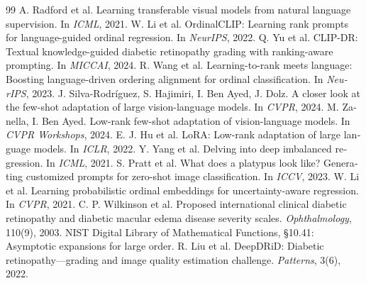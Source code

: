 \clearpage
{}
\begin{latin}
\renewcommand{\refname}{References}
\begin{thebibliography}{99}
 A. Radford et al. Learning transferable visual models from natural language supervision. In \emph{ICML}, 2021.
 W. Li et al. OrdinalCLIP: Learning rank prompts for language-guided ordinal regression. In \emph{NeurIPS}, 2022.
 Q. Yu et al. CLIP-DR: Textual knowledge-guided diabetic retinopathy grading with ranking-aware prompting. In \emph{MICCAI}, 2024.
 R. Wang et al. Learning-to-rank meets language: Boosting language-driven ordering alignment for ordinal classification. In \emph{NeurIPS}, 2023.
 J. Silva-Rodr\'iguez, S. Hajimiri, I. Ben Ayed, J. Dolz. A closer look at the few-shot adaptation of large vision-language models. In \emph{CVPR}, 2024.
 M. Zanella, I. Ben Ayed. Low-rank few-shot adaptation of vision-language models. In \emph{CVPR Workshops}, 2024.
 E. J. Hu et al. LoRA: Low-rank adaptation of large language models. In \emph{ICLR}, 2022.
 Y. Yang et al. Delving into deep imbalanced regression. In \emph{ICML}, 2021.
 S. Pratt et al. What does a platypus look like? Generating customized prompts for zero-shot image classification. In \emph{ICCV}, 2023.
 W. Li et al. Learning probabilistic ordinal embeddings for uncertainty-aware regression. In \emph{CVPR}, 2021.
 C. P. Wilkinson et al. Proposed international clinical diabetic retinopathy and diabetic macular edema disease severity scales. \emph{Ophthalmology}, 110(9), 2003.
 NIST Digital Library of Mathematical Functions, \S10.41: Asymptotic expansions for large order.
 R. Liu et al. DeepDRiD: Diabetic retinopathy---grading and image quality estimation challenge. \emph{Patterns}, 3(6), 2022.
\end{thebibliography}
\end{latin}
